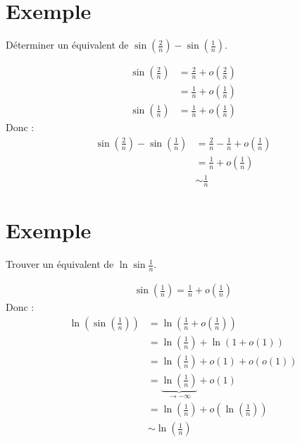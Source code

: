 \documentclass[../main.tex]{subfiles}
\begin{document}
\section{Exemple}
\begin{tcolorbox}[title=Exemple 24.36, title filled=false, colframe=darkgreen, colback=darkgreen!10!white]
    Déterminer un équivalent de $\sin\left(\frac{2}{n}\right)-\sin\left(\frac{1}{n}\right)$. 
\end{tcolorbox}

\begin{align*}
    \sin\left(\frac{2}{n}\right) &= \frac{2}{n} + o\left(\frac{2}{n}\right) \\
    &= \frac{1}{n} + o\left(\frac{1}{n}\right) \\
    \sin\left(\frac{1}{n}\right) &= \frac{1}{n} + o\left(\frac{1}{n}\right)
\end{align*}
Donc : 
\begin{align*}
    \sin\left(\frac{2}{n}\right) - \sin\left(\frac{1}{n}\right) &= \frac{2}{n} - \frac{1}{n} + o\left(\frac{1}{n}\right) \\
    &= \frac{1}{n} + o\left(\frac{1}{n}\right) \\
    &\sim \frac{1}{n}
\end{align*}

\section{Exemple}
\begin{tcolorbox}[title=Exemple 24.43, title filled=false, colframe=darkgreen, colback=darkgreen!10!white]
    Trouver un équivalent de $\ln \sin \frac{1}{n}$. 
\end{tcolorbox}
\begin{align*}
    \sin \left(\frac{1}{n}\right) = \frac{1}{n} + o \left(\frac{1}{n}\right)
\end{align*}
Donc : 
\begin{align*}
    \ln \left( \sin \left(\frac{1}{n}\right) \right) &= \ln \left( \frac{1}{n} + o \left(\frac{1}{n}\right) \right) \\
    &= \ln \left( \frac{1}{n} \right) + \ln \left(1 + o \left(1\right) \right) \\
    &= \ln \left(\frac{1}{n}\right) + o(1)  + o(o(1)) \\
    &= \underbrace{\ln \left(\frac{1}{n}\right)}_{\to -\infty} + o(1) \\
    &= \ln \left(\frac{1}{n}\right) + o\left(\ln \left(\frac{1}{n}\right)\right) \\
    &\sim \ln \left(\frac{1}{n}\right)
\end{align*}
\end{document}
